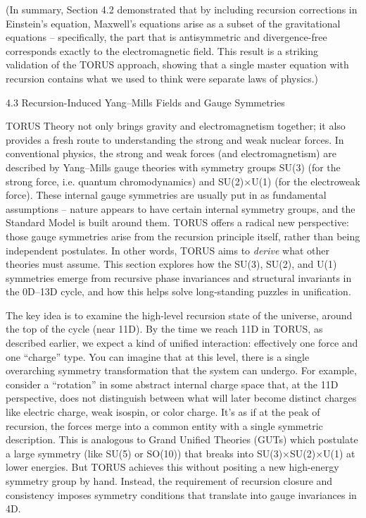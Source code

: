 \documentclass[]{article}
\begin{document}
(In summary, Section 4.2 demonstrated that by including recursion
corrections in Einstein's equation, Maxwell's equations arise as a
subset of the gravitational equations -- specifically, the part that is
antisymmetric and divergence-free corresponds exactly to the
electromagnetic field. This result is a striking validation of the TORUS
approach, showing that a single master equation with recursion contains
what we used to think were separate laws of physics.)

4.3 Recursion-Induced Yang--Mills Fields and Gauge Symmetries

TORUS Theory not only brings gravity and electromagnetism together; it
also provides a fresh route to understanding the strong and weak nuclear
forces. In conventional physics, the strong and weak forces (and
electromagnetism) are described by Yang--Mills gauge theories with
symmetry groups SU(3) (for the strong force, i.e. quantum
chromodynamics) and SU(2)×U(1) (for the electroweak force). These
internal gauge symmetries are usually put in as fundamental assumptions
-- nature appears to have certain internal symmetry groups, and the
Standard Model is built around them. TORUS offers a radical new
perspective: those gauge symmetries arise from the recursion principle
itself, rather than being independent postulates. In other words, TORUS
aims to \emph{derive} what other theories must assume. This section
explores how the SU(3), SU(2), and U(1) symmetries emerge from recursive
phase invariances and structural invariants in the 0D--13D cycle, and
how this helps solve long-standing puzzles in unification.

The key idea is to examine the high-level recursion state of the
universe, around the top of the cycle (near 11D). By the time we reach
11D in TORUS, as described earlier, we expect a kind of unified
interaction: effectively one force and one ``charge'' type. You can
imagine that at this level, there is a single overarching symmetry
transformation that the system can undergo. For example, consider a
``rotation'' in some abstract internal charge space that, at the 11D
perspective, does not distinguish between what will later become
distinct charges like electric charge, weak isospin, or color charge.
It's as if at the peak of recursion, the forces merge into a common
entity with a single symmetric description. This is analogous to Grand
Unified Theories (GUTs) which postulate a large symmetry (like SU(5) or
SO(10)) that breaks into SU(3)×SU(2)×U(1) at lower energies. But TORUS
achieves this without positing a new high-energy symmetry group by hand.
Instead, the requirement of recursion closure and consistency imposes
symmetry conditions that translate into gauge invariances in 4D.
\end{document}

